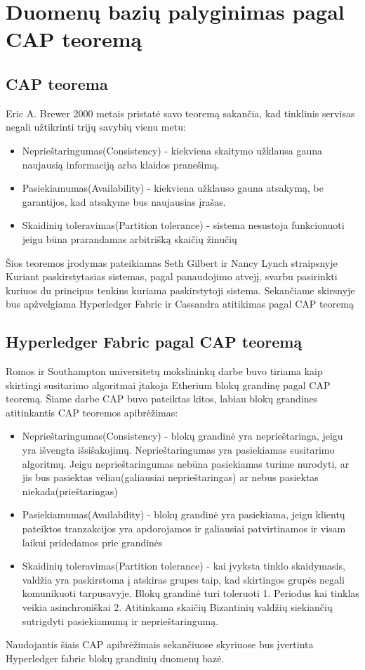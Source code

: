 \documentclass{VUMIFPSkursinis}
\begin{document}
\section{Duomenų bazių palyginimas pagal CAP teoremą}
	\subsection{CAP teorema}
		Eric A. Brewer 2000 \cite{CAP} metais pristatė savo teoremą sakančia, kad tinklinis servisas negali užtikrinti trijų savybių vienu metu:
		\begin{itemize}
			\item{Neprieštaringumas(Consistency) - kiekviena skaitymo užklausa gauna naujausią informaciją arba klaidos pranešimą.}
			\item{Pasiekiamumas(Availability) - kiekviena užklauso gauna atsakymą, be garantijos, kad atsakyme bus naujausias įrašas. }
			\item{Skaidinių toleravimas(Partition tolerance) - sistema nesustoja funkcionuoti jeigu būna prarandamas arbitrišką skaičių žinučių}
		\end{itemize}
		Šios teoremos įrodymas pateikiamas Seth Gilbert ir Nancy Lynch straipsnyje \cite{CAPP}
		\linebreak
		Kuriant paskirstytasias sistemas, pagal panaudojimo atvejį, svarbu pasirinkti kuriuos du principus tenkins kuriama paskirstytoji sistema.
		Sekančiame skirsnyje bus apžvelgiama Hyperledger Fabric ir Cassandra atitikimas pagal CAP teoremą
	\subsection{Hyperledger Fabric pagal CAP teoremą}
		Romos ir Southampton universitetų mokslininkų darbe \cite{BCCAP} buvo tiriama kaip skirtingi susitarimo algoritmai įtakoja Etherium blokų grandinę
		pagal CAP teoremą. Šiame darbe CAP buvo pateiktas kitos, labiau blokų grandines atitinkantis CAP teoremos apibrėžimas:
	
		\begin{itemize}
			\item{Neprieštaringumas(Consistency) - blokų grandinė yra neprieštaringa, jeigu yra išvengta išsišakojimų. Neprieštaringumas yra pasiekiamas 
					susitarimo algoritmų. Jeigu neprieštaringumas nebūna pasiekiamas turime nurodyti, ar jis bus pasiektas vėliau(galiausiai neprieštaringas) ar nebus pasiektas niekada(prieštaringas) }
			\item{Pasiekiamumas(Availability) - blokų grandinė yra pasiekiama, jeigu klientų pateiktos tranzakcijos yra apdorojamos ir galiausiai patvirtinamos ir visam laikui pridedamos prie grandinės}
			\item{Skaidinių toleravimas(Partition tolerance) - kai įvyksta tinklo skaidymasis, valdžia yra paskirstoma į atskiras grupes taip, kad skirtingos grupės negali komunikuoti tarpusavyje. Blokų grandinė turi toleruoti 1. Periodus kai tinklas veikia asinchroniškai 2. Atitinkama skaičių Bizantinių valdžių siekiančių sutrigdyti pasiekiamumą ir neprieštaringumą.}
		\end{itemize}
		Naudojantis šiais CAP apibrėžimais sekančiuose skyriuose bus įvertinta Hyperledger fabric blokų grandinių duomenų bazė.
\end{document}

